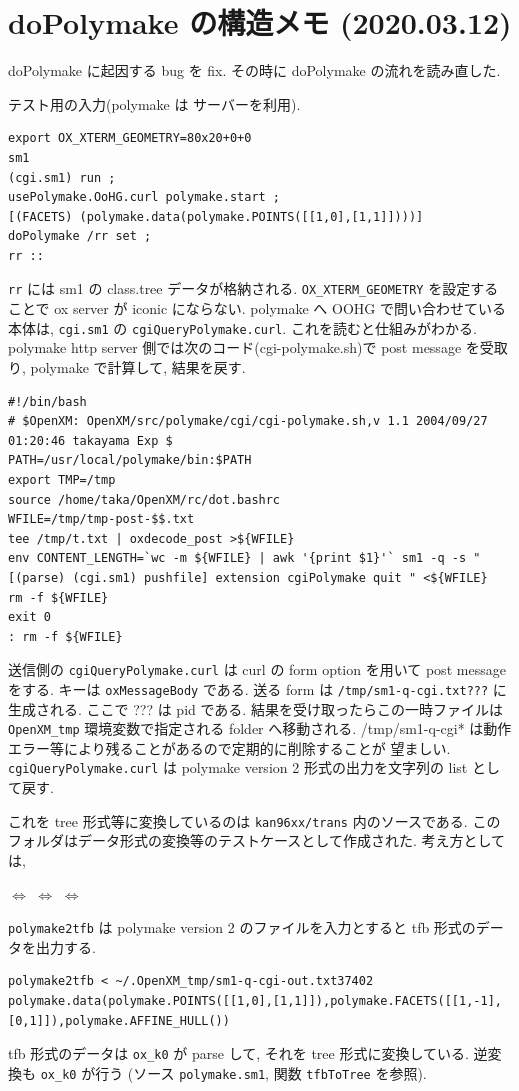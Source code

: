 \documentclass{jarticle}
\begin{document}
\section{doPolymake の構造メモ (2020.03.12)}
doPolymake に起因する bug を fix. その時に doPolymake の流れを読み直した.

テスト用の入力(polymake は サーバーを利用).
{\tiny
\begin{verbatim}
export OX_XTERM_GEOMETRY=80x20+0+0
sm1
(cgi.sm1) run ;
usePolymake.OoHG.curl polymake.start ;
[(FACETS) (polymake.data(polymake.POINTS([[1,0],[1,1]])))]
doPolymake /rr set ;
rr ::
\end{verbatim}
}
{\tt rr} には sm1 の class.tree データが格納される.
{\tt OX\_XTERM\_GEOMETRY} を設定することで ox server が iconic にならない.
polymake へ OOHG で問い合わせている本体は,
{\tt cgi.sm1} の {\tt cgiQueryPolymake.curl}.
これを読むと仕組みがわかる.
polymake http server 側では次のコード(cgi-polymake.sh)で post message を受取り, polymake で計算して, 結果を戻す.
{\tiny
\begin{verbatim}
#!/bin/bash
# $OpenXM: OpenXM/src/polymake/cgi/cgi-polymake.sh,v 1.1 2004/09/27 01:20:46 takayama Exp $ 
PATH=/usr/local/polymake/bin:$PATH
export TMP=/tmp
source /home/taka/OpenXM/rc/dot.bashrc
WFILE=/tmp/tmp-post-$$.txt
tee /tmp/t.txt | oxdecode_post >${WFILE}
env CONTENT_LENGTH=`wc -m ${WFILE} | awk '{print $1}'` sm1 -q -s "[(parse) (cgi.sm1) pushfile] extension cgiPolymake quit " <${WFILE}
rm -f ${WFILE}
exit 0
: rm -f ${WFILE}
\end{verbatim}
}
送信側の {\tt cgiQueryPolymake.curl} は curl の form option を用いて
post message をする.
キーは {\tt oxMessageBody} である.
送る form は {\tt /tmp/sm1-q-cgi.txt???} に生成される.
ここで ??? は pid である.
結果を受け取ったらこの一時ファイルは {\tt OpenXM\_tmp} 環境変数で指定される
folder へ移動される.
{\rm /tmp/sm1-q-cgi*} は動作エラー等により残ることがあるので定期的に削除することが
望ましい.
{\tt cgiQueryPolymake.curl} は polymake version 2 形式の出力を文字列の list として戻す.

これを tree 形式等に変換しているのは {\tt kan96xx/trans} 内のソースである.
このフォルダはデータ形式の変換等のテストケースとして作成された.
考え方としては,
\begin{center}
 $\Leftrightarrow$
 $\Leftrightarrow$  
$\Leftrightarrow$ 
\end{center}
{\tt polymake2tfb} は polymake version 2 のファイルを入力とすると
tfb 形式のデータを出力する.
{\tiny
\begin{verbatim}
polymake2tfb < ~/.OpenXM_tmp/sm1-q-cgi-out.txt37402
polymake.data(polymake.POINTS([[1,0],[1,1]]),polymake.FACETS([[1,-1],[0,1]]),polymake.AFFINE_HULL())
\end{verbatim}
}
tfb 形式のデータは {\tt ox\_k0} が parse して, それを tree 形式に変換している.
逆変換も {\tt ox\_k0} が行う
(ソース {\tt polymake.sm1}, 関数 {\tt tfbToTree} を参照).
\end{document}
